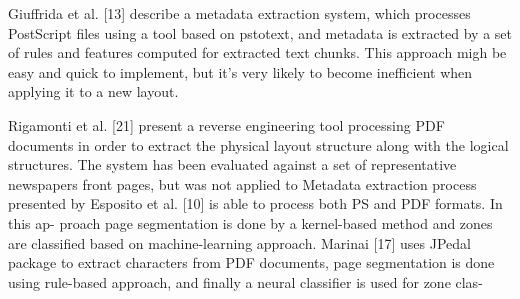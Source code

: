 Giuffrida et al. [13] describe a metadata extraction system, which processes PostScript files using a tool
based on pstotext, and metadata is extracted by a set of rules and features computed for extracted text chunks. This approach migh be easy and quick to implement, but it's very likely to become inefficient when applying it to a new layout.

Rigamonti et al. [21] present a reverse engineering tool processing PDF documents in order to extract the physical layout structure along with the logical structures. The system has been evaluated against a set of representative newspapers front pages, but was not applied to 
Metadata extraction process presented by Esposito et al. [10]
is able to process both PS and PDF formats. In this ap-
proach page segmentation is done by a kernel-based method
and zones are classified based on machine-learning approach.
Marinai [17] uses JPedal package to extract characters from
PDF documents, page segmentation is done using rule-based
approach, and finally a neural classifier is used for zone clas-